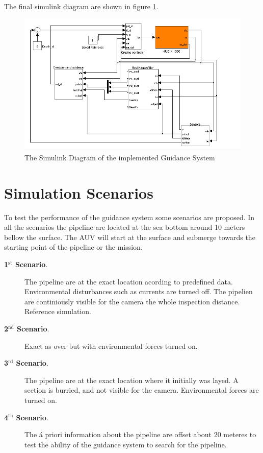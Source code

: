 	The final simulink diagram are shown in figure \ref{fig:ch3_simulink}.
	\begin{figure}[htbp]
		\centering
		\includegraphics[width=\textwidth]{pics/simulink}
		\caption{The Simulink Diagram of the implemented Guidance System}
		\label{fig:ch3_simulink}
	\end{figure}

	

\section{Simulation Scenarios}
	To test the performance of the guidance system some scenarios are proposed. In all the scenarios the
	pipeline are located at the sea bottom around 10 meters bellow the surface. The AUV will start at the
	surface and submerge towards the starting point of the pipeline or the mission. 
	\begin{description}
		\item[\textbf{1$^{\mathrm{st}}$ Scenario}.] The pipeline are at the exact location acording 
		to predefined data. Environmental disturbances such as currents are turned off. The pipelien are
		continiously visible for the camera the whole inspection distance. Reference simulation.
		\item[\textbf{2$^{\mathrm{nd}}$ Scenario}.] Exact as over but with environmental forces turned on.
		\item[\textbf{3$^{\mathrm{rd}}$ Scenario}.] The pipeline are at the exact location where 
		it initially was layed. A section is burried, and not visible for the camera. Environmental
		forces are turned on.
		\item[\textbf{4$^{\mathrm{th}}$ Scenario}.] The \'a priori information about the pipeline 
		are offset about 20 meteres to test the ability of the guidance system to search for the pipeline.
	\end{description}


